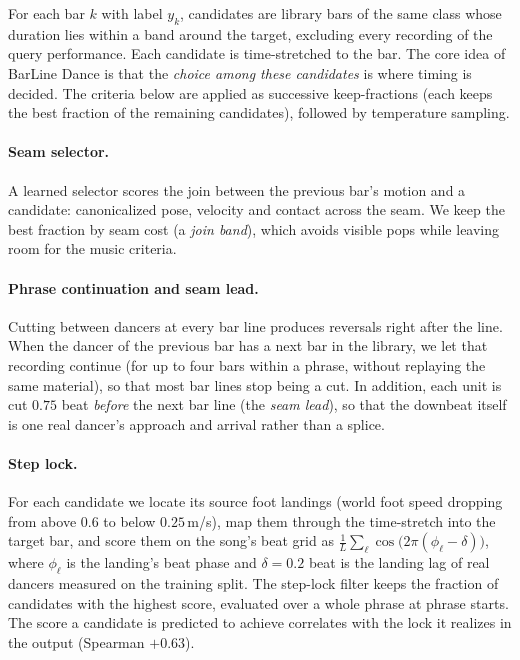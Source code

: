 \documentclass[10pt]{article}
\begin{document}
For each bar $k$ with label $y_k$, candidates are library bars of the same class whose duration lies within a band around the target, excluding every recording of the query performance.
Each candidate is time-stretched to the bar.
The core idea of BarLine Dance is that the \emph{choice among these candidates} is where timing is decided.
The criteria below are applied as successive keep-fractions (each keeps the best fraction of the remaining candidates), followed by temperature sampling.

\paragraph{Seam selector.}
A learned selector scores the join between the previous bar's motion and a candidate: canonicalized pose, velocity and contact across the seam.
We keep the best fraction by seam cost (a \emph{join band}), which avoids visible pops while leaving room for the music criteria.

\paragraph{Phrase continuation and seam lead.}
Cutting between dancers at every bar line produces reversals right after the line.
When the dancer of the previous bar has a next bar in the library, we let that recording continue (for up to four bars within a phrase, without replaying the same material), so that most bar lines stop being a cut.
In addition, each unit is cut $0.75$ beat \emph{before} the next bar line (the \emph{seam lead}), so that the downbeat itself is one real dancer's approach and arrival rather than a splice.

\paragraph{Step lock.}
For each candidate we locate its source foot landings (world foot speed dropping from above $0.6$ to below $0.25$\,m/s), map them through the time-stretch into the target bar, and score them on the song's beat grid as $\frac{1}{L}\sum_{\ell}\cos\!\big(2\pi(\phi_\ell - \delta)\big)$, where $\phi_\ell$ is the landing's beat phase and $\delta{=}0.2$ beat is the landing lag of real dancers measured on the training split.
The step-lock filter keeps the fraction of candidates with the highest score, evaluated over a whole phrase at phrase starts.
The score a candidate is predicted to achieve correlates with the lock it realizes in the output (Spearman $+0.63$).
\end{document}
